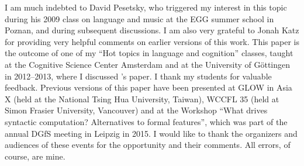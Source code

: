 \documentclass[output=paper]{langsci/langscibook}
\begin{document}
I am much indebted to David Pesetsky, who triggered my interest in this topic
during his 2009 class on language and music at the EGG summer school in Poznan,
and during subsequent discussions. I am also very grateful to Jonah Katz for
providing very helpful comments on earlier versions of this work. This paper is
the outcome of one of my “Hot topics in language and cognition” classes, taught
at the Cognitive Science Center Amsterdam and at the University of Göttingen in
2012–2013, where I discussed \citeauthor{KatzPes2011}’s paper. I thank my
students for valuable feedback.  Previous versions of this paper have been
presented at GLOW in Asia X (held at the National Tsing Hua University,
Taiwan), WCCFL 35 (held at Simon Frasier University, Vancouver) and at the
Workshop “What drives syntactic computation?  Alternatives to formal features”,
which was part of the annual DGfS meeting in Leipzig in 2015. I would like to
thank the organizers and audiences of these events for the opportunity and
their comments. All errors, of course, are mine.

{\sloppy
\printbibliography[heading=subbibliography,notkeyword=this]
}
\end{document}
